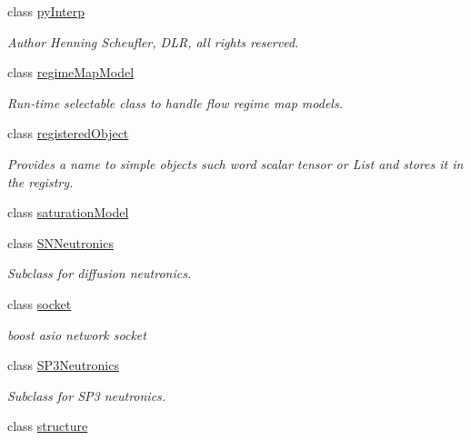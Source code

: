 \begin{DoxyCompactItemize}
class \hyperlink{classFoam_1_1pyInterp}{py\+Interp}
\begin{DoxyCompactList}\small\item\em Author Henning Scheufler, D\+LR, all rights reserved. \end{DoxyCompactList}\item 
class \hyperlink{classFoam_1_1regimeMapModel}{regime\+Map\+Model}
\begin{DoxyCompactList}\small\item\em Run-\/time selectable class to handle flow regime map models. \end{DoxyCompactList}\item 
class \hyperlink{classFoam_1_1registeredObject}{registered\+Object}
\begin{DoxyCompactList}\small\item\em Provides a name to simple objects such word scalar tensor or List and stores it in the registry. \end{DoxyCompactList}\item 
class \hyperlink{classFoam_1_1saturationModel}{saturation\+Model}
\item 
class \hyperlink{classFoam_1_1SNNeutronics}{S\+N\+Neutronics}
\begin{DoxyCompactList}\small\item\em Subclass for diffusion neutronics. \end{DoxyCompactList}\item 
class \hyperlink{classFoam_1_1socket}{socket}
\begin{DoxyCompactList}\small\item\em boost asio network socket \end{DoxyCompactList}\item 
class \hyperlink{classFoam_1_1SP3Neutronics}{S\+P3\+Neutronics}
\begin{DoxyCompactList}\small\item\em Subclass for S\+P3 neutronics. \end{DoxyCompactList}\item 
class \hyperlink{classFoam_1_1structure}{structure}

\end{DoxyCompactItemize}

